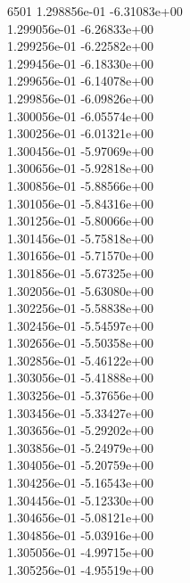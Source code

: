 6501	1.298856e-01	-6.31083e+00	\\ 	1.299056e-01	-6.26833e+00	\\ 	1.299256e-01	-6.22582e+00	\\ 	1.299456e-01	-6.18330e+00	\\ 	1.299656e-01	-6.14078e+00	\\ 	1.299856e-01	-6.09826e+00	\\ 	1.300056e-01	-6.05574e+00	\\ 	1.300256e-01	-6.01321e+00	\\ 	1.300456e-01	-5.97069e+00	\\ 	1.300656e-01	-5.92818e+00	\\ 	1.300856e-01	-5.88566e+00	\\ 	1.301056e-01	-5.84316e+00	\\ 	1.301256e-01	-5.80066e+00	\\ 	1.301456e-01	-5.75818e+00	\\ 	1.301656e-01	-5.71570e+00	\\ 	1.301856e-01	-5.67325e+00	\\ 	1.302056e-01	-5.63080e+00	\\ 	1.302256e-01	-5.58838e+00	\\ 	1.302456e-01	-5.54597e+00	\\ 	1.302656e-01	-5.50358e+00	\\ 	1.302856e-01	-5.46122e+00	\\ 	1.303056e-01	-5.41888e+00	\\ 	1.303256e-01	-5.37656e+00	\\ 	1.303456e-01	-5.33427e+00	\\ 	1.303656e-01	-5.29202e+00	\\ 	1.303856e-01	-5.24979e+00	\\ 	1.304056e-01	-5.20759e+00	\\ 	1.304256e-01	-5.16543e+00	\\ 	1.304456e-01	-5.12330e+00	\\ 	1.304656e-01	-5.08121e+00	\\ 	1.304856e-01	-5.03916e+00	\\ 	1.305056e-01	-4.99715e+00	\\ 	1.305256e-01	-4.95519e+00	\\ \hline
